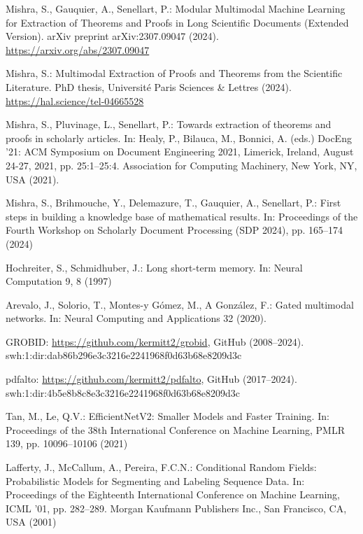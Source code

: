 \documentclass[runningheads]{llncs}
\begin{document}
%
\begin{thebibliography}{10}

Mishra, S., Gauquier, A., Senellart, P.: Modular Multimodal Machine Learning for Extraction of Theorems and Proofs in Long Scientific Documents (Extended Version). arXiv preprint arXiv:2307.09047 (2024). \url{https://arxiv.org/abs/2307.09047}

Mishra, S.: Multimodal Extraction of Proofs and Theorems from the Scientific Literature. PhD thesis, Universit{\'e} Paris Sciences \& Lettres (2024). \url{https://hal.science/tel-04665528}


Mishra, S., Pluvinage, L., Senellart, P.: Towards extraction of theorems and proofs in scholarly articles. In: Healy, P., Bilauca, M., Bonnici, A. (eds.) DocEng '21: ACM Symposium on Document Engineering 2021, Limerick, Ireland, August 24-27, 2021, pp. 25:1--25:4. Association for Computing Machinery, New York, NY, USA (2021). 

Mishra, S., Brihmouche, Y., Delemazure, T., Gauquier, A., Senellart, P.: First steps in building a knowledge base of mathematical results. In: Proceedings of the Fourth Workshop on Scholarly Document Processing (SDP 2024), pp. 165--174 (2024)

Hochreiter, S., Schmidhuber, J.:  Long short-term memory. In: Neural Computation 9, 8 (1997)

Arevalo, J., Solorio, T., Montes-y Gómez, M., A González, F.: Gated multimodal networks. In: Neural Computing and Applications 32 (2020). 

GROBID: \url{https://github.com/kermitt2/grobid}, GitHub (2008--2024). swh:1:dir:dab86b296e3c3216e2241968f0d63b68e8209d3c

pdfalto: \url{https://github.com/kermitt2/pdfalto}, GitHub (2017--2024). swh:1:dir:4b5e8b8c8e3c3216e2241968f0d63b68e8209d3c

Tan, M., Le, Q.V.: EfficientNetV2: Smaller Models and Faster Training. In: Proceedings of the 38th International Conference on Machine Learning, PMLR 139, pp. 10096--10106 (2021)

Lafferty, J., McCallum, A., Pereira, F.C.N.: Conditional Random Fields: Probabilistic Models for Segmenting and Labeling Sequence Data. In: Proceedings of the Eighteenth International Conference on Machine Learning, ICML '01, pp. 282--289. Morgan Kaufmann Publishers Inc., San Francisco, CA, USA (2001)


\end{thebibliography}
\end{document}
